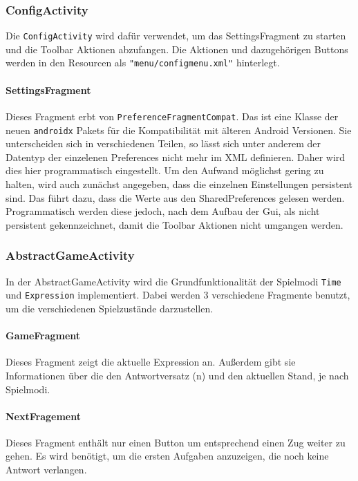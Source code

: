 \subsubsection{ConfigActivity}
Die \texttt{ConfigActivity} wird dafür verwendet, um das SettingsFragment zu
starten und die Toolbar Aktionen abzufangen. Die Aktionen und dazugehörigen
Buttons werden in den Resourcen als \texttt{"menu/configmenu.xml"} hinterlegt.

\paragraph{SettingsFragment}
Dieses Fragment erbt von \texttt{PreferenceFragmentCompat}. Das ist eine
Klasse der neuen \texttt{androidx} Pakets für die Kompatibilität mit älteren
Android Versionen. Sie unterscheiden sich in verschiedenen Teilen,
so lässt sich unter anderem der Datentyp der einzelenen Preferences nicht
mehr im XML definieren. Daher wird dies hier
programmatisch eingestellt. Um den Aufwand möglichst gering zu halten,
wird auch zunächst angegeben, dass die einzelnen Einstellungen persistent
sind. Das führt dazu, dass die Werte aus den SharedPreferences gelesen werden.
Programmatisch werden diese jedoch, nach dem Aufbau der Gui, als nicht
persistent gekennzeichnet, damit die Toolbar Aktionen nicht umgangen werden.

\subsubsection{AbstractGameActivity}
In der AbstractGameActivity wird die Grundfunktionalität  der Spielmodi
\texttt{Time} und \texttt{Expression} implementiert. Dabei werden 3 verschiedene
Fragmente benutzt, um die verschiedenen Spielzustände darzustellen.

\paragraph{GameFragment}
Dieses Fragment zeigt die aktuelle Expression an. Außerdem gibt sie Informationen
über die den Antwortversatz (n) und den aktuellen Stand, je nach Spielmodi.

\paragraph{NextFragement}
Dieses Fragment enthält nur einen Button um entsprechend einen Zug weiter zu
gehen. Es wird benötigt, um die ersten Aufgaben anzuzeigen, die noch keine
Antwort verlangen.

